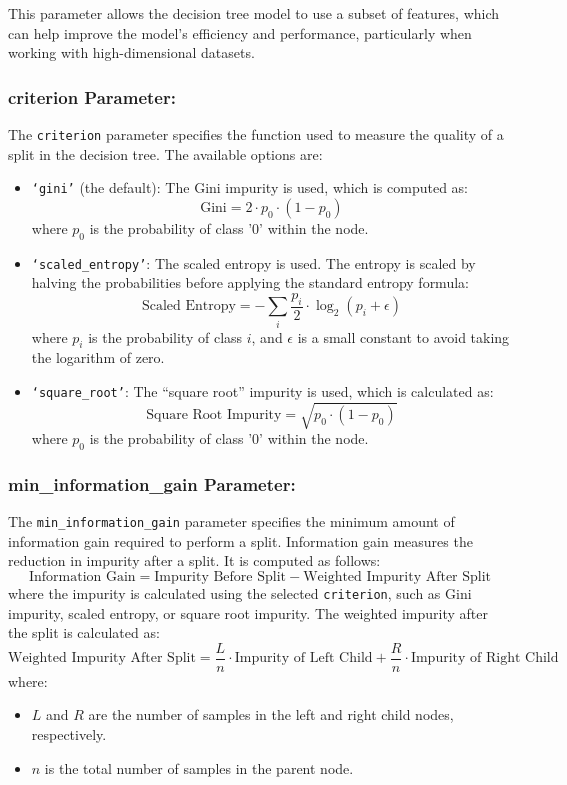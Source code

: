 \documentclass{article}
\begin{document}
This parameter allows the decision tree model to use a subset of features, which can help improve the model’s efficiency and performance, particularly when working with high-dimensional datasets.

\subsubsection*{criterion Parameter:}

The \texttt{criterion} parameter specifies the function used to measure the quality of a split in the decision tree. The available options are:

\begin{itemize}
    \item \texttt{`gini'} (the default): The Gini impurity is used, which is computed as:
    \[
    \text{Gini} = 2 \cdot p_0 \cdot (1 - p_0)
    \]
    where \( p_0 \) is the probability of class '0' within the node.
    
    \item \texttt{`scaled\_entropy'}: The scaled entropy is used. The entropy is scaled by halving the probabilities before applying the standard entropy formula:
    \[
    \text{Scaled Entropy} = -\sum_{i} \frac{p_i}{2} \cdot \log_2(p_i + \epsilon)
    \]
    where \( p_i \) is the probability of class \( i \), and \( \epsilon \) is a small constant to avoid taking the logarithm of zero.
    
    \item \texttt{`square\_root'}: The ``square root'' impurity is used, which is calculated as:
    \[
    \text{Square Root Impurity} = \sqrt{p_0 \cdot (1 - p_0)}
    \]
    where \( p_0 \) is the probability of class '0' within the node.
\end{itemize}

\subsubsection*{min\_information\_gain Parameter:}

The \texttt{min\_information\_gain} parameter specifies the minimum amount of information gain required to perform a split. Information gain measures the reduction in impurity after a split. It is computed as follows:
\[
    \text{Information Gain} = \text{Impurity Before Split} - \text{Weighted Impurity After Split}
\]
where the impurity is calculated using the selected \texttt{criterion}, such as Gini impurity, scaled entropy, or square root impurity. The weighted impurity after the split is calculated as:
\[
    \text{Weighted Impurity After Split} = \frac{L}{n} \cdot \text{Impurity of Left Child} + \frac{R}{n} \cdot \text{Impurity of Right Child}
\]
where:
\begin{itemize}
    \item \( L \) and \( R \) are the number of samples in the left and right child nodes, respectively.
    \item \( n \) is the total number of samples in the parent node.
\end{itemize}
\end{document}
